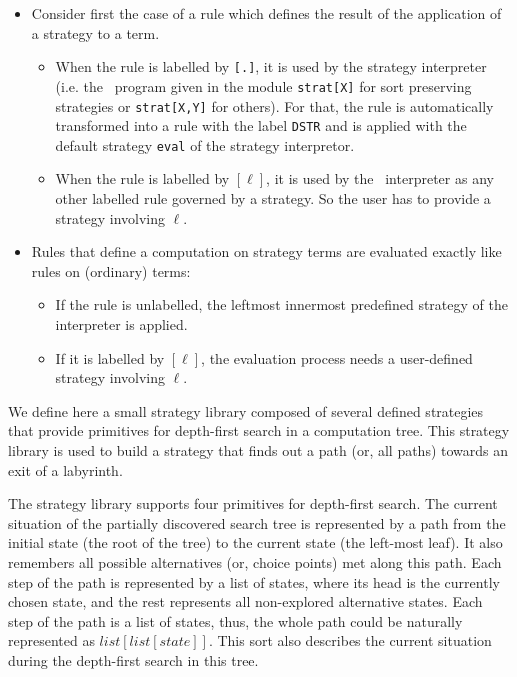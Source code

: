 \begin{itemize}
\item 
Consider first the case of a rule which defines the result of the 
application of a strategy to a term.
\begin{itemize}
\item
When the rule is labelled by \texttt{[.]},
it is used by the strategy interpreter (i.e. the \elan\ program
given in the module \texttt{strat[X]} for sort preserving strategies
or \texttt{strat[X,Y]} for others).
For that, the rule  is automatically transformed into a rule with 
the label \texttt{DSTR}
and is applied with the default strategy \texttt{eval} of the strategy 
interpretor.
\item 
When the rule is labelled by \texttt{$[\ell]$},
it is used by the \elan\ interpreter as any other labelled rule
governed by a strategy. So the user has to provide a strategy 
involving  \texttt{$\ell$}.
\end{itemize}

\item
Rules that define a computation on strategy terms are evaluated 
exactly like rules on (ordinary) terms:
\begin{itemize}
\item
If the rule is unlabelled, the leftmost innermost
predefined strategy of the interpreter is applied.
\item
If it is labelled by $[\ell]$, the evaluation process 
needs a user-defined strategy involving $\ell$.
\end{itemize}

\end{itemize}



\EX
\label{robot}

We define here a small strategy library composed of several defined
strategies that provide primitives for depth-first search in a
computation tree.  This strategy library is used to build a strategy
that finds out a path (or, all paths) towards an exit of a labyrinth.

The strategy library supports four primitives for depth-first search.
The current situation of the partially discovered search tree is
represented by a path from the initial state (the root of the tree) to
the current state (the left-most leaf).  It also remembers all
possible alternatives (or, choice points) met along this path. Each
step of the path is represented by a list of states, where its head is
the currently chosen state, and the rest represents all non-explored
alternative states.  Each step of the path is a list of states, thus,
the whole path could be naturally represented as $list[list[state]]$.
This sort also describes the current situation during the depth-first
search in this tree.

